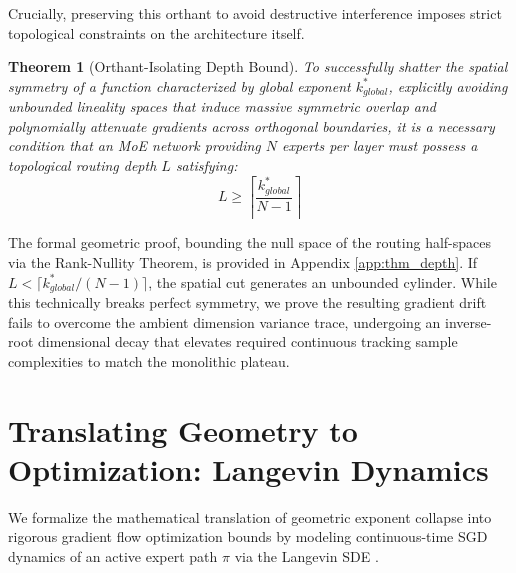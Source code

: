 \documentclass{article}
\newcommand{\1}{\mathbb{I}}
\newtheorem{theorem}{Theorem}[section]
\begin{document}
Crucially, preserving this orthant to avoid destructive interference imposes strict topological constraints on the architecture itself. 

\begin{theorem}[Orthant-Isolating Depth Bound] \label{thm:depth}
To successfully shatter the spatial symmetry of a function characterized by global exponent $k_{global}^*$, explicitly avoiding unbounded lineality spaces that induce massive symmetric overlap and polynomially attenuate gradients across orthogonal boundaries, it is a necessary condition that an MoE network providing $N$ experts per layer must possess a topological routing depth $L$ satisfying:
\begin{equation}
    L \ge \left\lceil \frac{k_{global}^*}{N-1} \right\rceil
\end{equation}
\end{theorem}
The formal geometric proof, bounding the null space of the routing half-spaces via the Rank-Nullity Theorem, is provided in Appendix \ref{app:thm_depth}. If $L < \lceil k_{global}^*/(N-1) \rceil$, the spatial cut generates an unbounded cylinder. While this technically breaks perfect symmetry, we prove the resulting gradient drift fails to overcome the ambient dimension variance trace, undergoing an inverse-root dimensional decay that elevates required continuous tracking sample complexities to match the monolithic plateau.

\section{Translating Geometry to Optimization: Langevin Dynamics}
\label{sec:langevin}

We formalize the mathematical translation of geometric exponent collapse into rigorous gradient flow optimization bounds by modeling continuous-time SGD dynamics of an active expert path $\pi$ via the Langevin SDE \citep{hu2019mean, sirignano2020mean}.
\end{document}
